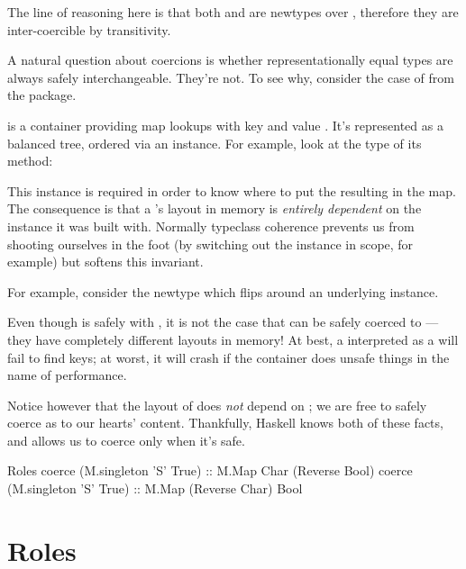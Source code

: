 \documentclass[book.tex]{subfiles}
\begin{document}
The line of reasoning here is that both  and  are
newtypes over , therefore they are inter-coercible by transitivity.

A natural question about coercions is whether representationally equal types are
always safely interchangeable. They're not. To see why, consider the case of
 from the  package.

 is a container providing map lookups with key  and value
. It's represented as a balanced tree, ordered via an  instance.
For example, look at the type of its  method:


This  instance is required in order to know where to put the resulting
 in the map. The consequence is that a 's layout in memory is
\emph{entirely dependent} on the  instance it was built with.
Normally typeclass coherence prevents us from shooting ourselves in the foot (by
switching out the  instance in scope, for example) but 
softens this invariant.

For example, consider the newtype  which flips around an underlying
 instance.


Even though  is safely  with , it is not the
case that  can be safely coerced to ---they
have completely different layouts in memory! At best, a 
interpreted as a  will fail to find keys; at worst, it will crash if
the container does unsafe things in the name of performance.

Notice however that the layout of  does \emph{not} depend on ;
we are free to safely coerce  as  to our hearts'
content. Thankfully, Haskell knows both of these facts, and allows us to coerce
only when it's safe.

\begin{dorepl}{Roles}
coerce (M.singleton 'S' True) :: M.Map Char (Reverse Bool)
coerce (M.singleton 'S' True) :: M.Map (Reverse Char) Bool
\end{dorepl}

\section{Roles}
\end{document}
